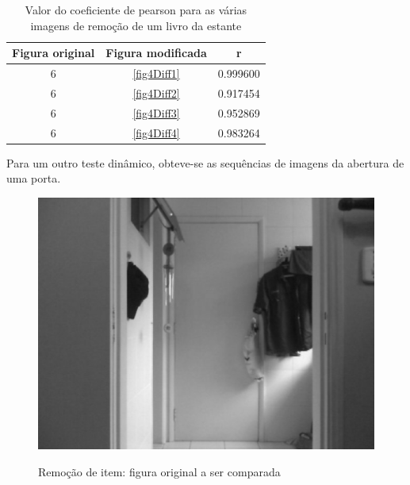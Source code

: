 \documentclass[10pt,a4paper]{article}
\begin{document}
\begin{table}[h!]
  \begin{center}
    \caption{Valor do coeficiente de pearson para as várias imagens de
      remoção de um livro da estante}
    \begin{tabular}{|c|c|c|}
      \hline
      Figura original & Figura modificada & r\\
      \hline
      6 &  \ref{fig4Diff1} & 0.999600\\
      6 &  \ref{fig4Diff2} &  0.917454\\
      6 &  \ref{fig4Diff3} &   0.952869\\
      6 &  \ref{fig4Diff4} &   0.983264\\
      \hline
    \end{tabular}\label{tab:livro}
  \end{center}
\end{table}


\newpage
Para um outro teste dinâmico, obteve-se as sequências de imagens da
abertura de uma porta.

\begin{figure}[h!]
\begin{center}
\includegraphics[scale=0.35]{photos/porta/gBase} \label{porta}
\caption{Remoção de item: figura original a ser comparada}
\end{center}
\end{figure}
\end{document}
